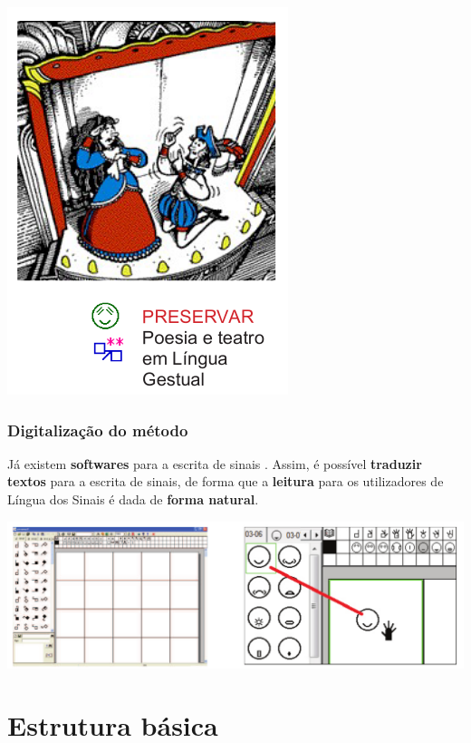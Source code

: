 \documentclass[10pt]{beamer}
\theoremstyle{plain}
\theoremstyle{definition}
\begin{document}
\begin{frame}
\begin{center}
\begin{minipage}{0.3\linewidth}
			\end{minipage}
			\begin{minipage}{0.3\linewidth}
				\includegraphics[scale=0.24]{figures/preservar.png}
			\end{minipage}
		\end{center}
	\end{frame}

	\begin{frame}
		\frametitle{Digitalização do método}
		
		Já existem \textbf{softwares} para a escrita de sinais \cite{rocha2001signwriting}. Assim, é possível \textbf{traduzir textos} para a escrita de sinais, de forma que a \textbf{leitura} para os utilizadores de Língua dos Sinais é dada de \textbf{forma natural}.
		
		\begin{center}
			\includegraphics[scale=0.24]{figures/software.png}
		\end{center}
	\end{frame}
	
	\section{Estrutura básica}
	
\end{document}
